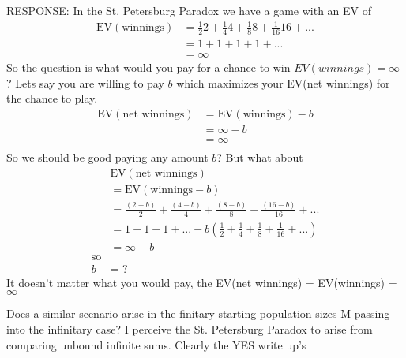\documentclass[12pt, letterpaper]{article}
\begin{document}
RESPONSE: 
        In the St. Petersburg Paradox we have a game with an EV of
        \begin{align*}
            \text{EV}(\text{winnings})&=\frac{1}{2}2 + \frac{1}{4}4 + \frac{1}{8}8 + \frac{1}{16}16 + ...\\
            &=1 + 1 + 1 + 1 + ...\\
            &=\infty
        \end{align*}
        So the question is what would you pay for a chance to win $EV(winnings)=\infty$?  Lets say you are willing to pay $b$ which maximizes your EV(net winnings) for the chance to play.
        \begin{align*}
            \text{EV}(\text{net winnings})&=\text{EV}(\text{winnings})-b\\ 
             &=\infty-b \\
             &= \infty\\
        \end{align*}
        So we should be good paying any amount $b$? But what about
        \begin{align*}
             &\text{EV}(\text{net winnings})\\
             &=\text{EV}(\text{winnings}-b)\\ 
            & =\frac{(2-b)}{2} + \frac{(4-b)}{4} + \frac{(8-b)}{8} + \frac{(16-b)}{16} + ...\\
            & =1 + 1 + 1 + ... -b(\frac{1}{2}+\frac{1}{4}+\frac{1}{8}+\frac{1}{16}+...)\\
            & =\infty-b\\
            \text{so}\\
           b & = \text{  ?  }
        \end{align*}
        It doesn't matter what you would pay, the EV(net winnings) = EV(winnings) = $\infty$

        Does a similar scenario arise in the finitary starting population sizes M passing into the infinitary case?  I perceive the St. Petersburg Paradox to arise from comparing unbound infinite sums. Clearly the YES write up's 
\end{document}

